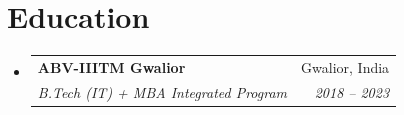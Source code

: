 \documentclass[letterpaper,11pt]{article}
\makeatletter
\newcommand{\resumeSubheading}[4]{
  \vspace{-2pt}\item
    \begin{tabular*}{0.97\textwidth}[t]{l@{\extracolsep{\fill}}r}
      \textbf{#1} & #2 \\
      \textit{\small#3} & \textit{\small #4} \\
    \end{tabular*}\vspace{-7pt}
}
\newcommand{\resumeSubHeadingListStart}{\begin{itemize}[leftmargin=0.15in, label={}]}
\newcommand{\resumeSubHeadingListEnd}{\end{itemize}}
\makeatother
\begin{document}
\section{Education}
\resumeSubHeadingListStart
  \resumeSubheading
    {ABV-IIITM Gwalior}{Gwalior, India}
    {B.Tech (IT) + MBA Integrated Program}{2018 -- 2023}
\resumeSubHeadingListEnd
\end{document}
